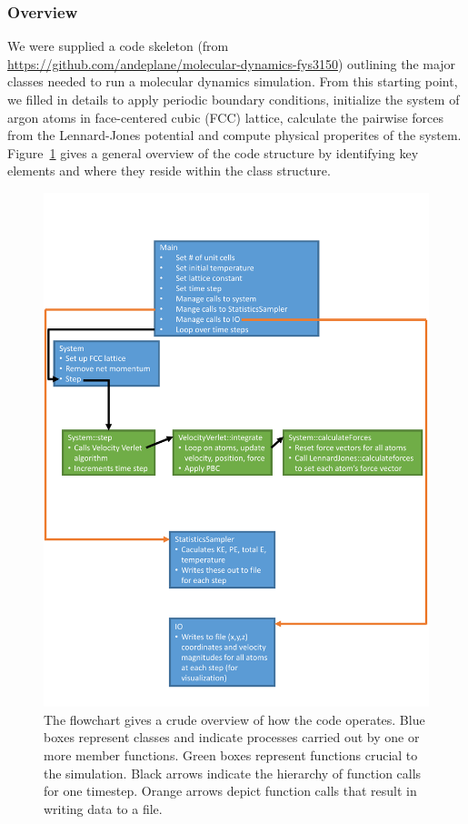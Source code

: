 \documentclass[10pt,showpacs,preprintnumbers,footinbib,amsmath,amssymb,aps,prl,twocolumn,groupedaddress,superscriptaddress,showkeys]{revtex4-1}
\begin{document}
\subsubsection*{Overview}

We were supplied a code skeleton (from
\url{ https://github.com/andeplane/molecular-dynamics-fys3150})
 outlining the major classes needed to run a molecular dynamics
simulation. From this starting point, we filled in details to apply
periodic boundary conditions, initialize the system of argon
atoms in face-centered cubic (FCC) lattice, calculate the pairwise
forces from the Lennard-Jones potential and compute physical
properites of the system. Figure~\ref{fig:flowchart} gives a
general overview of the code structure by identifying key
elements and where they reside within the class structure.

\begin{figure}
	\includegraphics[width=\textwidth]{figures/flowchart.pdf}
	\caption{The flowchart gives a crude overview of how the
	code operates. Blue boxes represent classes and
	indicate processes carried out by one or more member
	functions. Green boxes represent functions crucial to the 
	simulation. Black arrows indicate the hierarchy of function
	calls for one timestep. Orange arrows depict function
	calls that result in writing data to a file.}
	\label{fig:flowchart}
\end{figure}
	
\end{document}
